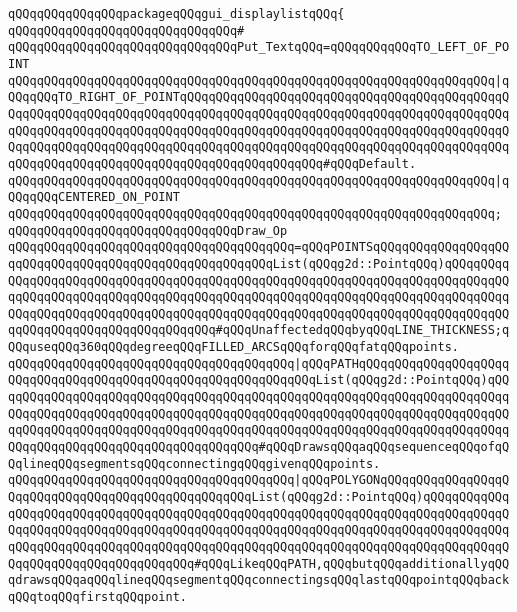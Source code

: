 \newline
\verb|qQQqqQQqqQQqqQQqpackageqQQqgui_displaylistqQQq{|\newline
\verb|qQQqqQQqqQQqqQQqqQQqqQQqqQQqqQQq#|\newline
\verb|qQQqqQQqqQQqqQQqqQQqqQQqqQQqqQQqPut_TextqQQq=qQQqqQQqqQQqTO_LEFT_OF_POINT|\newline
\verb|qQQqqQQqqQQqqQQqqQQqqQQqqQQqqQQqqQQqqQQqqQQqqQQqqQQqqQQqqQQqqQQqqQQq|\verb#|qQQqqQQqTO_RIGHT_OF_POINTqQQqqQQqqQQqqQQqqQQqqQQqqQQqqQQqqQQqqQQqqQQqqQQqqQQqqQQqqQQqqQQqqQQqqQQqqQQqqQQqqQQqqQQqqQQqqQQqqQQqqQQqqQQqqQQqqQQqqQQqqQQqqQQqqQQqqQQqqQQqqQQqqQQqqQQqqQQqqQQqqQQqqQQqqQQqqQQqqQQqqQQqqQQqqQQqqQQqqQQqqQQqqQQqqQQqqQQqqQQqqQQqqQQqqQQqqQQqqQQqqQQqqQQqqQQqqQQqqQQqqQQqqQQqqQQqqQQqqQQqqQQqqQQqqQQqqQQqqQQq#\verb|#qQQqDefault.|\newline
\verb|qQQqqQQqqQQqqQQqqQQqqQQqqQQqqQQqqQQqqQQqqQQqqQQqqQQqqQQqqQQqqQQqqQQq|\verb#|qQQqqQQqCENTERED_ON_POINT#\newline
\verb|qQQqqQQqqQQqqQQqqQQqqQQqqQQqqQQqqQQqqQQqqQQqqQQqqQQqqQQqqQQqqQQqqQQq;|\newline
\newline
\verb|qQQqqQQqqQQqqQQqqQQqqQQqqQQqqQQqDraw_Op|\newline
\verb|qQQqqQQqqQQqqQQqqQQqqQQqqQQqqQQqqQQqqQQq=qQQqPOINTSqQQqqQQqqQQqqQQqqQQqqQQqqQQqqQQqqQQqqQQqqQQqqQQqqQQqqQQqList(qQQqg2d::PointqQQq)qQQqqQQqqQQqqQQqqQQqqQQqqQQqqQQqqQQqqQQqqQQqqQQqqQQqqQQqqQQqqQQqqQQqqQQqqQQqqQQqqQQqqQQqqQQqqQQqqQQqqQQqqQQqqQQqqQQqqQQqqQQqqQQqqQQqqQQqqQQqqQQqqQQqqQQqqQQqqQQqqQQqqQQqqQQqqQQqqQQqqQQqqQQqqQQqqQQqqQQqqQQqqQQqqQQqqQQqqQQqqQQqqQQqqQQqqQQqqQQqqQQqqQQq#qQQqUnaffectedqQQqbyqQQqLINE_THICKNESS;qQQquseqQQq360qQQqdegreeqQQqFILLED_ARCSqQQqforqQQqfatqQQqpoints.|\newline
\verb|qQQqqQQqqQQqqQQqqQQqqQQqqQQqqQQqqQQqqQQq|\verb#|qQQqPATHqQQqqQQqqQQqqQQqqQQqqQQqqQQqqQQqqQQqqQQqqQQqqQQqqQQqqQQqqQQqqQQqList(qQQqg2d::PointqQQq)qQQqqQQqqQQqqQQqqQQqqQQqqQQqqQQqqQQqqQQqqQQqqQQqqQQqqQQqqQQqqQQqqQQqqQQqqQQqqQQqqQQqqQQqqQQqqQQqqQQqqQQqqQQqqQQqqQQqqQQqqQQqqQQqqQQqqQQqqQQqqQQqqQQqqQQqqQQqqQQqqQQqqQQqqQQqqQQqqQQqqQQqqQQqqQQqqQQqqQQqqQQqqQQqqQQqqQQqqQQqqQQqqQQqqQQqqQQqqQQqqQQqqQQq#\verb|#qQQqDrawsqQQqaqQQqsequenceqQQqofqQQqlineqQQqsegmentsqQQqconnectingqQQqgivenqQQqpoints.|\newline
\verb|qQQqqQQqqQQqqQQqqQQqqQQqqQQqqQQqqQQqqQQq|\verb#|qQQqPOLYGONqQQqqQQqqQQqqQQqqQQqqQQqqQQqqQQqqQQqqQQqqQQqqQQqqQQqList(qQQqg2d::PointqQQq)qQQqqQQqqQQqqQQqqQQqqQQqqQQqqQQqqQQqqQQqqQQqqQQqqQQqqQQqqQQqqQQqqQQqqQQqqQQqqQQqqQQqqQQqqQQqqQQqqQQqqQQqqQQqqQQqqQQqqQQqqQQqqQQqqQQqqQQqqQQqqQQqqQQqqQQqqQQqqQQqqQQqqQQqqQQqqQQqqQQqqQQqqQQqqQQqqQQqqQQqqQQqqQQqqQQqqQQqqQQqqQQqqQQqqQQqqQQqqQQqqQQqqQQq#\verb|#qQQqLikeqQQqPATH,qQQqbutqQQqadditionallyqQQqdrawsqQQqaqQQqlineqQQqsegmentqQQqconnectingsqQQqlastqQQqpointqQQqbackqQQqtoqQQqfirstqQQqpoint.|\newline
